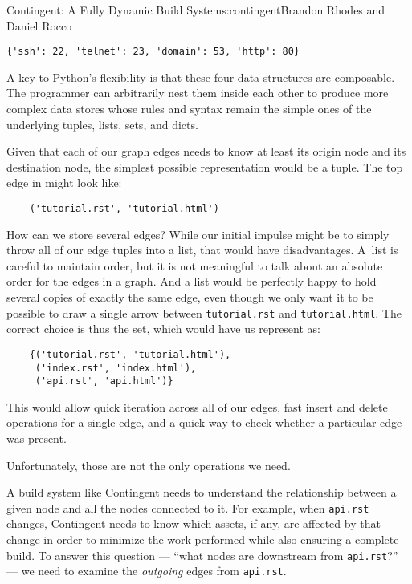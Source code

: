 \begin{aosachapter}{Contingent: A Fully Dynamic Build System}{s:contingent}{Brandon Rhodes and Daniel Rocco}
\begin{verbatim}
{'ssh': 22, 'telnet': 23, 'domain': 53, 'http': 80}
\end{verbatim}

A key to Python's flexibility is that these four data structures are
composable. The programmer can arbitrarily nest them inside each other
to produce more complex data stores whose rules and syntax remain the
simple ones of the underlying tuples, lists, sets, and dicts.

Given that each of our graph edges needs to know at least its origin
node and its destination node, the simplest possible representation
would be a tuple. The top edge in 
might look like:

\begin{verbatim}
    ('tutorial.rst', 'tutorial.html')
\end{verbatim}

How can we store several edges? While our initial impulse might be to
simply throw all of our edge tuples into a list, that would have
disadvantages. A~list is careful to maintain order, but it is not
meaningful to talk about an absolute order for the edges in a graph. And
a list would be perfectly happy to hold several copies of exactly the
same edge, even though we only want it to be possible to draw a single
arrow between \texttt{tutorial.rst} and \texttt{tutorial.html}. The
correct choice is thus the set, which would have us represent
 as:

\begin{verbatim}
    {('tutorial.rst', 'tutorial.html'),
     ('index.rst', 'index.html'),
     ('api.rst', 'api.html')}
\end{verbatim}

This would allow quick iteration across all of our edges, fast insert
and delete operations for a single edge, and a quick way to check
whether a particular edge was present.

Unfortunately, those are not the only operations we need.

A build system like Contingent needs to understand the relationship
between a given node and all the nodes connected to it. For example,
when \texttt{api.rst} changes, Contingent needs to know which assets, if
any, are affected by that change in order to minimize the work performed
while also ensuring a complete build. To answer this question --- ``what
nodes are downstream from \texttt{api.rst}?'' --- we need to examine the
\emph{outgoing} edges from \texttt{api.rst}.


\end{aosachapter}
